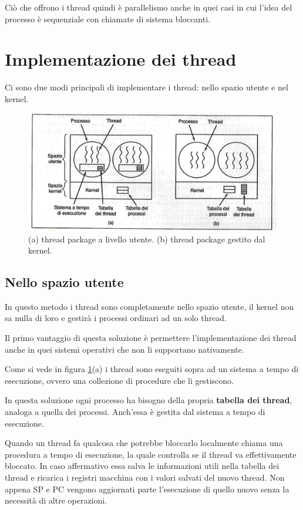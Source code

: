 Ciò che offrono i thread quindi è parallelismo anche in quei casi in cui l'idea del processo è sequenziale con chiamate di sistema bloccanti.

\section{Implementazione dei thread}

Ci sono due modi principali di implementare i thread: nello spazio utente e nel kernel.

\begin{figure}[H]
    \centering
    \includegraphics[width=0.9\linewidth]{assets/impl5.png}
    \caption{(a) thread package a livello utente. (b) thread package gestito dal kernel.}
    \label{impl5}
\end{figure}

\subsection{Nello spazio utente}

In questo metodo i thread sono completamente nello spazio utente, il kernel non sa nulla di loro e gestirà i processi ordinari ad un solo thread.

Il primo vantaggio di questa soluzione è permettere l'implementazione dei thread anche in quei sistemi operativi che non li supportano nativamente.

Come si vede in figura \ref{impl5}(a) i thread sono eseguiti sopra ad un sistema a tempo di esecuzione, ovvero una collezione di procedure che li gestiscono.

In questa soluzione ogni processo ha bisogno della propria \textbf{tabella dei thread}, analoga a quella dei processi. Anch'essa è gestita dal sistema a tempo di esecuzione.

Quando un thread fa qualcosa che potrebbe bloccarlo localmente chiama una procedura a tempo di esecuzione, la quale controlla se il thread va effettivamente bloccato. In caso affermativo essa salva le informazioni utili nella tabella dei thread e ricarica i registri macchina con i valori salvati del nuovo thread. Non appena SP e PC vengono aggiornati parte l'esecuzione di quello nuovo senza la necessità di altre operazioni.

